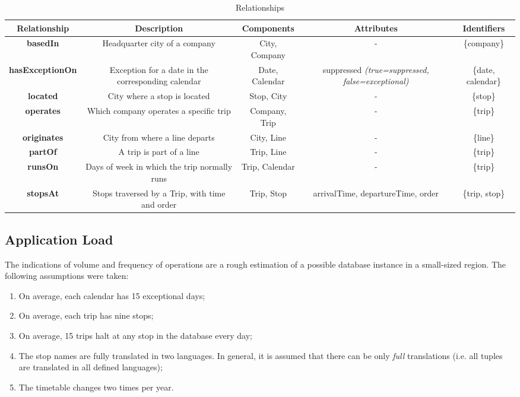 	\begin{table}[h!]
		\centering
		\begin{tabularx}{\columnwidth}{|c|C|c|C|c|}
			\hline
			\textbf{Relationship} & \textbf{Description} & \textbf{Components} & \textbf{Attributes} & \textbf{Identifiers} \\
			\hline
			\textbf{basedIn} & Headquarter city of a company & City, Company & - & \{company\} \\ \hline
			\textbf{hasExceptionOn} & Exception for a date in the corresponding calendar & Date, Calendar & suppressed \textit{(true=suppressed, false=exceptional)} & \{date, calendar\} \\ \hline
			\textbf{located} & City where a stop is located & Stop, City & - & \{stop\} \\ \hline
			\textbf{operates} & Which company operates a specific trip & Company, Trip & - & \{trip\} \\ \hline
			\textbf{originates} & City from where a line departs & City, Line & - & \{line\} \\ \hline
			\textbf{partOf} & A trip is part of a line & Trip, Line & - & \{trip\} \\ \hline
			\textbf{runsOn} & Days of week in which the trip normally runs & Trip, Calendar & - & \{trip\} \\ \hline
			\textbf{stopsAt} & Stops traversed by a Trip, with time and order & Trip, Stop & arrivalTime, departureTime, order & \{trip, stop\} \\
			\hline
		\end{tabularx}
		\caption{Relationships}\label{tbl:relationships}
	\end{table}

\newpage
\subsection{Application Load}

	The indications of volume and frequency of operations are a rough estimation of a possible database instance in a small-sized region. The following assumptions were taken: \label{sec:assumptions}
	\begin{enumerate}[topsep=3pt,itemsep=0pt]
		\item On average, each calendar has 15 exceptional days;
		\item On average, each trip has nine stops;
		\item On average, 15 trips halt at any stop in the database every day;
		\item The stop names are fully translated in two languages. In general, it is assumed that there can be only \textit{full} translations (i.e. all tuples are translated in all defined languages);
		\item The timetable changes two times per year.
	\end{enumerate}


